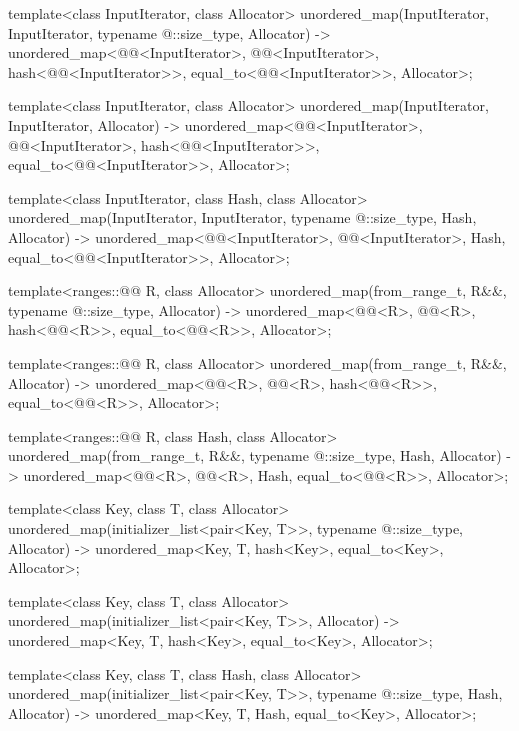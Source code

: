 \begin{codeblock}
{  template<class InputIterator, class Allocator>
    unordered_map(InputIterator, InputIterator, typename @\seebelow@::size_type, Allocator)
      -> unordered_map<@@<InputIterator>, @@<InputIterator>,
                       hash<@@<InputIterator>>,
                       equal_to<@@<InputIterator>>, Allocator>;

  template<class InputIterator, class Allocator>
    unordered_map(InputIterator, InputIterator, Allocator)
      -> unordered_map<@@<InputIterator>, @@<InputIterator>,
                       hash<@@<InputIterator>>,
                       equal_to<@@<InputIterator>>, Allocator>;

  template<class InputIterator, class Hash, class Allocator>
    unordered_map(InputIterator, InputIterator, typename @\seebelow@::size_type, Hash, Allocator)
      -> unordered_map<@@<InputIterator>, @@<InputIterator>, Hash,
                       equal_to<@@<InputIterator>>, Allocator>;

  template<ranges::@@ R, class Allocator>
    unordered_map(from_range_t, R&&, typename @\seebelow@::size_type, Allocator)
      -> unordered_map<@@<R>, @@<R>, hash<@@<R>>,
                       equal_to<@@<R>>, Allocator>;

  template<ranges::@@ R, class Allocator>
    unordered_map(from_range_t, R&&, Allocator)
      -> unordered_map<@@<R>, @@<R>, hash<@@<R>>,
                       equal_to<@@<R>>, Allocator>;

  template<ranges::@@ R, class Hash, class Allocator>
    unordered_map(from_range_t, R&&, typename @\seebelow@::size_type, Hash, Allocator)
      -> unordered_map<@@<R>, @@<R>, Hash,
                       equal_to<@@<R>>, Allocator>;

  template<class Key, class T, class Allocator>
    unordered_map(initializer_list<pair<Key, T>>, typename @\seebelow@::size_type,
                  Allocator)
      -> unordered_map<Key, T, hash<Key>, equal_to<Key>, Allocator>;

  template<class Key, class T, class Allocator>
    unordered_map(initializer_list<pair<Key, T>>, Allocator)
      -> unordered_map<Key, T, hash<Key>, equal_to<Key>, Allocator>;

  template<class Key, class T, class Hash, class Allocator>
    unordered_map(initializer_list<pair<Key, T>>, typename @\seebelow@::size_type, Hash,
                  Allocator)
      -> unordered_map<Key, T, Hash, equal_to<Key>, Allocator>;
}
\end{codeblock}

